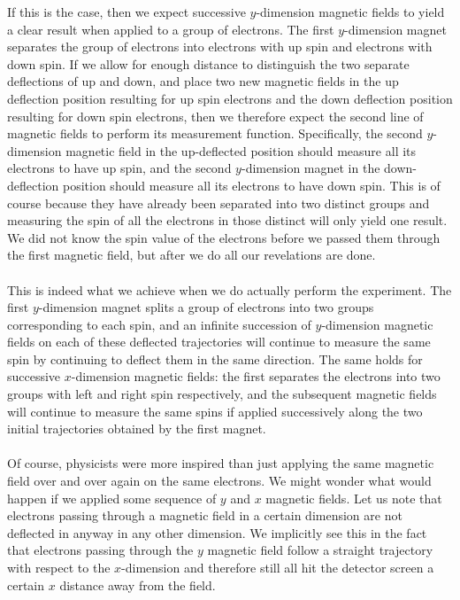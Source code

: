 If this is the case, then we expect successive $y$-dimension magnetic fields to yield a clear result when applied to a group of electrons. The first $y$-dimension magnet separates the group of electrons into electrons with up spin and electrons with down spin. If we allow for enough distance to distinguish the two separate deflections of up and down, and place two new magnetic fields in the up deflection position resulting for up spin electrons and the down deflection position resulting for down spin electrons, then we therefore expect the second line of magnetic fields to perform its measurement function. Specifically, the second $y$-dimension magnetic field in the up-deflected position should measure all its electrons to have up spin, and the second $y$-dimension magnet in the down-deflection position should measure all its electrons to have down spin. This is of course because they have already been separated into two distinct groups and measuring the spin of all the electrons in those distinct will only yield one result. We did not know the spin value of the electrons before we passed them through the first magnetic field, but after we do all our revelations are done.
\\\\
This is indeed what we achieve when we do actually perform the experiment. The first $y$-dimension magnet splits a group of electrons into two groups corresponding to each spin, and an infinite succession of $y$-dimension magnetic fields on each of these deflected trajectories will continue to measure the same spin by continuing to deflect them in the same direction. The same holds for successive $x$-dimension magnetic fields: the first separates the electrons into two groups with left and right spin respectively, and the subsequent magnetic fields will continue to measure the same spins if applied successively along the two initial trajectories obtained by the first magnet.
\\\\
Of course, physicists were more inspired than just applying the same magnetic field over and over again on the same electrons. We might wonder what would happen if we applied some sequence of $y$ and $x$ magnetic fields. Let us note that electrons passing through a magnetic field in a certain dimension are not deflected in anyway in any other dimension. We implicitly see this in the fact that electrons passing through the $y$ magnetic field follow a straight trajectory with respect to the $x$-dimension and therefore still all hit the detector screen a certain $x$ distance away from the field.
